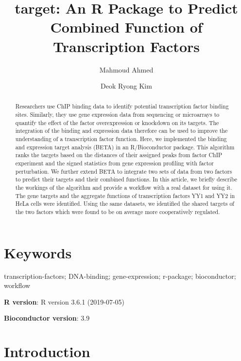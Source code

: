 \documentclass[9pt,a4paper,]{extarticle}
\begin{document}
\pagestyle{front}

\title{target: An R Package to Predict Combined Function of Transcription Factors}

\author[1]{Mahmoud Ahmed}
\author[1]{Deok Ryong Kim}

\maketitle
\thispagestyle{front}

\begin{abstract}
Researchers use ChIP binding data to identify potential transcription factor binding sites. Similarly, they use gene expression data from sequencing or microarrays to quantify the effect of the factor overexpression or knockdown on its targets. The integration of the binding and expression data therefore can be used to improve the understanding of a transcription factor function. Here, we implemented the binding and expression target analysis (BETA) in an R/Bioconductor package. This algorithm ranks the targets based on the distances of their assigned peaks from factor ChIP experiment and the signed statistics from gene expression profiling with factor perturbation. We further extend BETA to integrate two sets of data from two factors to predict their targets and their combined functions. In this article, we briefly describe the workings of the algorithm and provide a workflow with a real dataset for using it. The gene targets and the aggregate functions of transcription factors YY1 and YY2 in HeLa cells were identified. Using the same datasets, we identified the shared targets of the two factors which were found to be on average more cooperatively regulated.
\end{abstract}

\section*{Keywords}
transcription-factors; DNA-binding; gene-expression; r-package; bioconductor; workflow


\clearpage
\pagestyle{main}

\textbf{R version}: R version 3.6.1 (2019-07-05)

\textbf{Bioconductor version}: 3.9

\hypertarget{introduction}{%
\section{Introduction}\label{introduction}}
\end{document}
